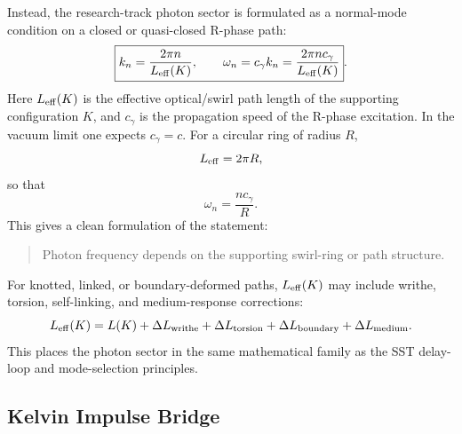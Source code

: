     Instead, the research-track photon sector is formulated as a normal-mode
    condition on a closed or quasi-closed R-phase path:
    \begin{equation}
        \boxed{
            k_n
            =
            \frac{2\pi n}{L_{\rm eff}(K)},
            \qquad
            \omega_n
            =
            c_\gamma k_n
            =
            \frac{2\pi n c_\gamma}{L_{\rm eff}(K)}
        } .
        \label{eq:photon_frequency_topological_path}
    \end{equation}
    Here \(L_{\rm eff}(K)\) is the effective optical/swirl path length of the
    supporting configuration \(K\), and \(c_\gamma\) is the propagation speed
    of the R-phase excitation.  In the vacuum limit one expects
    \(c_\gamma=c\).  For a circular ring of radius \(R\),
    \begin{equation}
        L_{\rm eff}=2\pi R,
    \end{equation}
    so that
    \begin{equation}
        \boxed{
            \omega_n
            =
            \frac{n c_\gamma}{R}
        } .
        \label{eq:ring_photon_frequency}
    \end{equation}
    This gives a clean formulation of the statement:
    
    \begin{quote}
        Photon frequency depends on the supporting swirl-ring or path structure.
    \end{quote}
    
    For knotted, linked, or boundary-deformed paths, \(L_{\rm eff}(K)\) may
    include writhe, torsion, self-linking, and medium-response corrections:
    \begin{equation}
        L_{\rm eff}(K)
        =
        L(K)
        +
        \Delta L_{\rm writhe}
        +
        \Delta L_{\rm torsion}
        +
        \Delta L_{\rm boundary}
        +
        \Delta L_{\rm medium}.
        \label{eq:effective_path_length_decomposition}
    \end{equation}
    This places the photon sector in the same mathematical family as the SST
    delay-loop and mode-selection principles.

\subsection{Kelvin Impulse Bridge}
    
